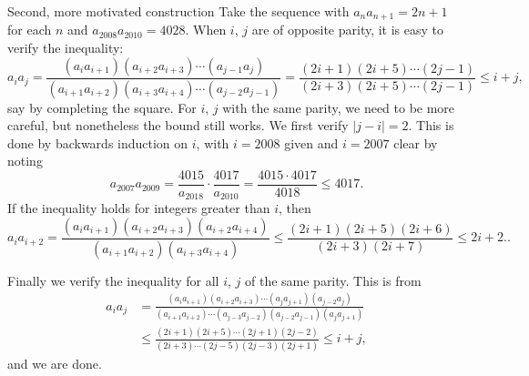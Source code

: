 \begin{customenv}{Second, more motivated construction}
    Take the sequence with $a_na_{n+1}=2n+1$ for each $n$ and $a_{2008}a_{2010}=4028$. When $i$, $j$ are of opposite parity, it is easy to verify the inequality: \[a_ia_j=\frac{(a_ia_{i+1})(a_{i+2}a_{i+3})\cdots(a_{j-1}a_j)}{(a_{i+1}a_{i+2})(a_{i+3}a_{i+4})\cdots(a_{j-2}a_{j-1})}=\frac{(2i+1)(2i+5)\cdots(2j-1)}{(2i+3)(2i+5)\cdots(2j-1)}\le i+j,\]
    say by completing the square. For $i$, $j$ with the same parity, we need to be more careful, but nonetheless the bound still works. We first verify $|j-i|=2$. This is done by backwards induction on $i$, with $i=2008$ given and $i=2007$ clear by noting \[a_{2007}a_{2009}=\frac{4015}{a_{2018}}\cdot\frac{4017}{a_{2010}}=\frac{4015\cdot4017}{4018}\le4017.\]
    If the inequality holds for integers greater than $i$, then \[a_ia_{i+2}=\frac{(a_ia_{i+1})(a_{i+2}a_{i+3})(a_{i+2}a_{i+4})}{(a_{i+1}a_{i+2})(a_{i+3}a_{i+4})}\le\frac{(2i+1)(2i+5)(2i+6)}{(2i+3)(2i+7)}\le2i+2..\]

    Finally we verify the inequality for all $i$, $j$ of the same parity. This is from
    \begin{align*}
        a_ia_j&=\frac{(a_ia_{i+1})(a_{i+2}a_{i+3})\cdots(a_ja_{j+1})(a_{j-2}a_j)}{(a_{i+1}a_{i+2})\cdots(a_{j-3}a_{j-2})(a_{j-2}a_{j-1})(a_ja_{j+1})}\\
        &\le\frac{(2i+1)(2i+5)\cdots(2j+1)(2j-2)}{(2i+3)\cdots(2j-5)(2j-3)(2j+1)}\le i+j,
    \end{align*}
    and we are done.
\end{customenv}

